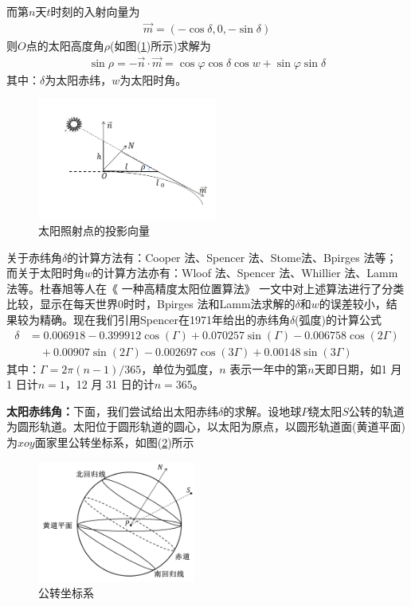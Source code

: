             而第$n$天$t$时刻的入射向量为
            \begin{align*}
            \vec{m} = (-\cos\delta,0,-\sin\delta)
            \end{align*}
            则$O$点的太阳高度角$\rho$(如图(\ref{fig:太阳照射点的投影向量})所示)求解为
            \begin{align*}
            \sin\rho = -\vec{n}\cdot\vec{m} = \cos\varphi\cos\delta\cos w+\sin\varphi\sin\delta
            \end{align*}
            其中：$\delta$为太阳赤纬，$w$为太阳时角。
			\begin{figure}[H]
			\centering
			\includegraphics[height=4cm]{images/Projection_Vector_of_Solar_Irradiation_Point.jpg}
			\caption{太阳照射点的投影向量}
			\label{fig:太阳照射点的投影向量}
			\end{figure}
            \par
            关于赤纬角$\delta$的计算方法有：Cooper 法、Spencer 法、Stome法、Bpirges 法等；而关于太阳时角$w$的计算方法亦有：Wloof 法、Spencer 法、Whillier 法、Lamm法等。杜春旭等人在《 一种高精度太阳位置算法》 一文中对上述算法进行了分类比较，显示在每天世界$0$时时，Bpirges 法和Lamm法求解的$\delta$和$w$的误差较小，结果较为精确。现在我们引用Spencer在1971年给出的赤纬角$\delta$(弧度)的计算公式
            \begin{align*}
            \delta &= 0.006918 - 0.399912 \cos(\Gamma) + 0.070257 \sin(\Gamma) - 0.006758 \cos(2\Gamma)\\
            &\quad + 0.00907 \sin(2\Gamma) - 0.002697\cos(3\Gamma) + 0.00148\sin(3\Gamma)
            \end{align*}
            其中：$\Gamma = 2\pi(n- 1)/365$，单位为弧度，$n$ 表示一年中的第$n$天即日期，如1 月 1 日计$ n=1 $，12 月 31 日的计$n=365$。
            \par
            \textbf{太阳赤纬角：}下面，我们尝试给出太阳赤纬$\delta$的求解。设地球$P$绕太阳$S$公转的轨道为圆形轨道。太阳位于圆形轨道的圆心，以太阳为原点，以圆形轨道面(黄道平面)为$xoy$面家里公转坐标系，如图(\ref{fig:公转坐标系})所示
			\begin{figure}[H]
			\centering
			\includegraphics[height=4cm]{images/Revolving_coordinate_system.jpg}
			\caption{公转坐标系}
			\label{fig:公转坐标系}
			\end{figure}
